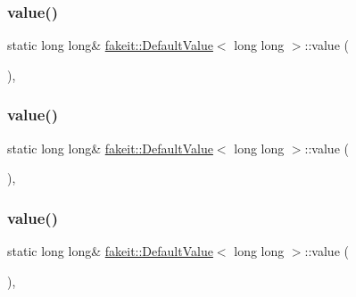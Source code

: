 \subsubsection{\texorpdfstring{value()}{value()}\hspace{0.1cm}{\footnotesize\ttfamily [6/9]}}
{\footnotesize\ttfamily static long long\& \mbox{\hyperlink{structfakeit_1_1DefaultValue}{fakeit\+::\+Default\+Value}}$<$ long long $>$\+::value (\begin{DoxyParamCaption}{ }\end{DoxyParamCaption})\hspace{0.3cm}{\ttfamily [inline]}, {\ttfamily [static]}}

\mbox{\label{structfakeit_1_1DefaultValue_3_01long_01long_01_4_ab955d01985ff900b3e625a53cf2a5607}} 
\subsubsection{\texorpdfstring{value()}{value()}\hspace{0.1cm}{\footnotesize\ttfamily [7/9]}}
{\footnotesize\ttfamily static long long\& \mbox{\hyperlink{structfakeit_1_1DefaultValue}{fakeit\+::\+Default\+Value}}$<$ long long $>$\+::value (\begin{DoxyParamCaption}{ }\end{DoxyParamCaption})\hspace{0.3cm}{\ttfamily [inline]}, {\ttfamily [static]}}

\mbox{\label{structfakeit_1_1DefaultValue_3_01long_01long_01_4_ab955d01985ff900b3e625a53cf2a5607}} 
\subsubsection{\texorpdfstring{value()}{value()}\hspace{0.1cm}{\footnotesize\ttfamily [8/9]}}
{\footnotesize\ttfamily static long long\& \mbox{\hyperlink{structfakeit_1_1DefaultValue}{fakeit\+::\+Default\+Value}}$<$ long long $>$\+::value (\begin{DoxyParamCaption}{ }\end{DoxyParamCaption})\hspace{0.3cm}{\ttfamily [inline]}, {\ttfamily [static]}}

